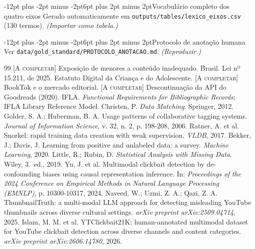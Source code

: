 \documentclass[12pt]{article}
\makeatletter
\renewcommand{\section}{\@startsection{section}{1}{\z@}%
  {-12pt plus -2pt minus -2pt}{6pt plus 2pt minus 2pt}{\normalfont\large\bfseries}}
\makeatother
\begin{document}
\section{Vocabulário completo dos quatro eixos}
Gerado automaticamente em \texttt{outputs/tables/lexico\_eixos.csv} (130 termos). \emph{(Importar como tabela.)}

\section{Protocolo de anotação humana}
Ver \texttt{data/gold\_standard/PROTOCOLO\_ANOTACAO.md}. \emph{(Reproduzir.)}

\begin{thebibliography}{99}
 \textsc{[A completar]} Exposição de menores a conteúdo inadequado.
 Brasil. Lei nº 15.211, de 2025. Estatuto Digital da Criança e do Adolescente.
 \textsc{[A completar]} BookTok e o mercado editorial.
 \textsc{[A completar]} Descontinuação da API do Goodreads (2020).
 IFLA. \emph{Functional Requirements for Bibliographic Records}; IFLA Library Reference Model.
 Christen, P. \emph{Data Matching}. Springer, 2012.
 Golder, S. A.; Huberman, B. A. Usage patterns of collaborative tagging systems. \emph{Journal of Information Science}, v. 32, n. 2, p. 198-208, 2006.
 Ratner, A. et al. Snorkel: rapid training data creation with weak supervision. \emph{VLDB}, 2017.
 Bekker, J.; Davis, J. Learning from positive and unlabeled data: a survey. \emph{Machine Learning}, 2020.
 Little, R.; Rubin, D. \emph{Statistical Analysis with Missing Data}. Wiley, 3.\ ed., 2019.
 Yu, J. et al. Multimodal clickbait detection by de-confounding biases using causal representation inference. In: \emph{Proceedings of the 2024 Conference on Empirical Methods in Natural Language Processing (EMNLP)}, p. 10300-10317, 2024.
 Naveed, W.; Uzmi, Z. A.; Qazi, Z. A. ThumbnailTruth: a multi-modal LLM approach for detecting misleading YouTube thumbnails across diverse cultural settings. \emph{arXiv preprint arXiv:2509.04714}, 2025.
 Islam, M. M. et al. YTClickbait21K: human-annotated multimodal dataset for YouTube clickbait detection across diverse channels and content categories. \emph{arXiv preprint arXiv:2606.14780}, 2026.

\end{thebibliography}
\end{document}
